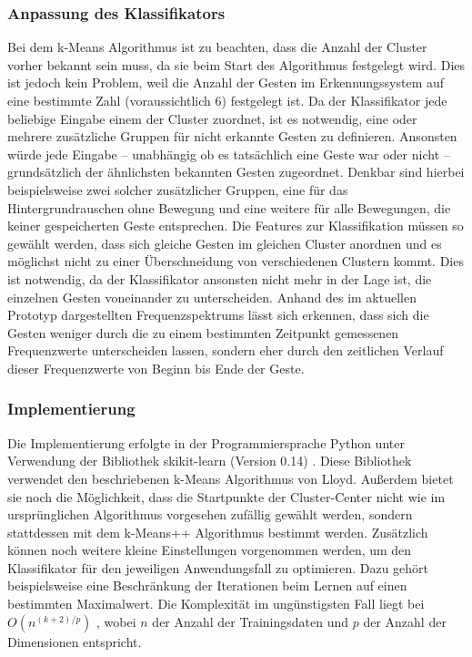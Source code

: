 \subsubsection{Anpassung des Klassifikators}
Bei dem k-Means Algorithmus ist zu beachten, dass die Anzahl der Cluster vorher bekannt sein muss, da sie beim Start des Algorithmus festgelegt wird. Dies ist jedoch kein Problem, weil die Anzahl der Gesten im Erkennungssystem auf eine bestimmte Zahl (voraussichtlich 6) festgelegt ist. Da der Klassifikator jede beliebige Eingabe einem der Cluster zuordnet, ist es notwendig, eine oder mehrere zusätzliche Gruppen für nicht erkannte Gesten zu definieren. Ansonsten würde jede Eingabe – unabhängig ob es tatsächlich eine Geste war oder nicht – grundsätzlich der ähnlichsten bekannten Gesten zugeordnet. Denkbar sind hierbei beispielsweise zwei solcher zusätzlicher Gruppen, eine für das Hintergrundrauschen ohne Bewegung und eine weitere für alle Bewegungen, die keiner gespeicherten Geste entsprechen.
Die Features zur Klassifikation müssen so gewählt werden, dass sich gleiche Gesten im gleichen Cluster anordnen und es möglichst nicht zu einer Überschneidung von verschiedenen Clustern kommt. Dies ist notwendig, da der Klassifikator ansonsten nicht mehr in der Lage ist, die einzelnen Gesten voneinander zu unterscheiden. Anhand des im aktuellen Prototyp dargestellten Frequenzspektrums lässt sich erkennen, dass sich die Gesten weniger durch die zu einem bestimmten Zeitpunkt gemessenen Frequenzwerte unterscheiden lassen, sondern eher durch den zeitlichen Verlauf dieser Frequenzwerte von Beginn bis Ende der Geste.


\subsubsection{Implementierung}
Die Implementierung erfolgte in der Programmiersprache Python unter Verwendung der Bibliothek skikit-learn (Version 0.14) \cite{sklearn}. Diese Bibliothek verwendet den beschriebenen k-Means Algorithmus von Lloyd. Außerdem bietet sie noch die Möglichkeit, dass die Startpunkte der Cluster-Center nicht wie im ursprünglichen Algorithmus vorgesehen zufällig gewählt werden, sondern stattdessen mit dem k-Means++ Algorithmus \cite{kMeans++} bestimmt werden. Zusätzlich können noch weitere kleine Einstellungen vorgenommen werden, um den Klassifikator für den jeweiligen Anwendungsfall  zu optimieren. Dazu gehört beispielsweise eine Beschränkung der Iterationen beim Lernen auf einen bestimmten Maximalwert.
Die Komplexität im ungünstigsten Fall liegt bei $O(n^{(k+2)/p})$ \cite{kMeansHowSlow}, wobei $n$ der Anzahl der Trainingsdaten und $p$ der Anzahl der Dimensionen entspricht.


